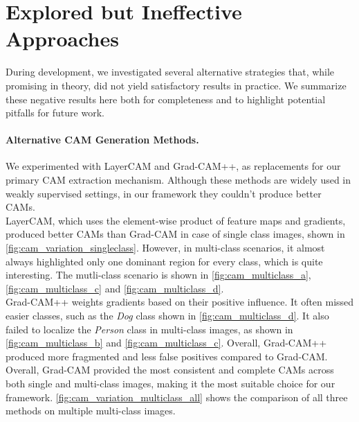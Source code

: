 
\section{Explored but Ineffective Approaches}
\label{sec:ineffective_approaches}

During development, we investigated several alternative strategies that, while promising in theory, did not yield satisfactory results in practice. We summarize these negative results here both for completeness and to highlight potential pitfalls for future work.  

\paragraph{Alternative CAM Generation Methods.} 
We experimented with LayerCAM and Grad-CAM++, as replacements for our primary CAM extraction mechanism. Although these methods are widely used in weakly supervised settings, in our framework they couldn't produce better CAMs. \\
LayerCAM, which uses the element-wise product of feature maps and gradients, produced better CAMs than Grad-CAM in case of single class images, shown in \autoref{fig:cam_variation_singleclass}. However, in multi-class scenarios, it almost always highlighted only one dominant region for every class, which is quite interesting. The mutli-class scenario is shown in \autoref{fig:cam_multiclass_a}, \autoref{fig:cam_multiclass_c} and \autoref{fig:cam_multiclass_d}. \\
Grad-CAM++ weights gradients based on their positive influence. It often missed easier classes, such as the \textit{Dog} class shown in \autoref{fig:cam_multiclass_d}. It also failed to localize the \textit{Person} class in multi-class images, as shown in \autoref{fig:cam_multiclass_b} and \autoref{fig:cam_multiclass_c}. Overall, Grad-CAM++ produced more fragmented and less false positives compared to Grad-CAM.\\
Overall, Grad-CAM provided the most consistent and complete CAMs across both single and multi-class images, making it the most suitable choice for our framework. \autoref{fig:cam_variation_multiclass_all} shows the comparison of all three methods on multiple multi-class images.

